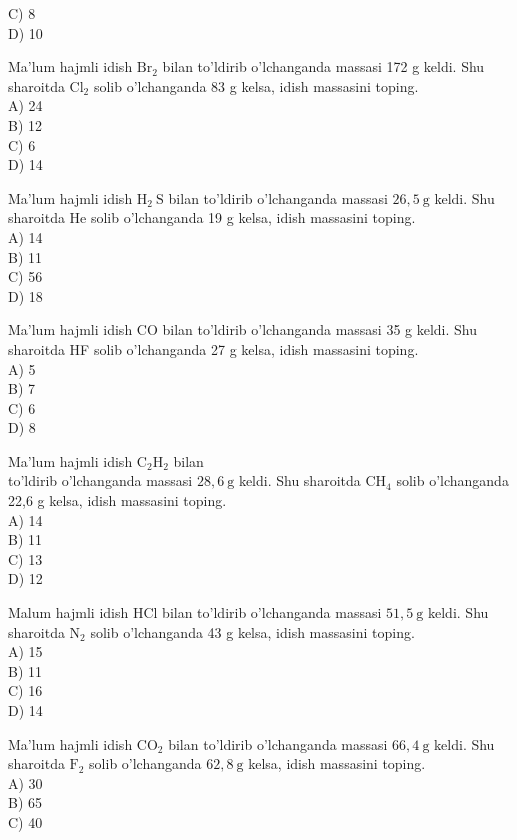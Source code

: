 C) 8\\
D) 10
  \item Ma'lum hajmli idish $\mathrm{Br}_{2}$ bilan to'ldirib o'lchanganda massasi 172 g keldi. Shu sharoitda $\mathrm{Cl}_{2}$ solib o'lchanganda 83 g kelsa, idish massasini toping.\\
A) 24\\
B) 12\\
C) 6\\
D) 14
  \item Ma'lum hajmli idish $\mathrm{H}_{2} \mathrm{~S}$ bilan to'ldirib o'lchanganda massasi $26,5 \mathrm{~g}$ keldi. Shu sharoitda He solib o'lchanganda 19 g kelsa, idish massasini toping.\\
A) 14\\
B) 11\\
C) 56\\
D) 18
  \item Ma'lum hajmli idish CO bilan to'ldirib o'lchanganda massasi 35 g keldi. Shu sharoitda HF solib o'lchanganda 27 g kelsa, idish massasini toping.\\
A) 5\\
B) 7\\
C) 6\\
D) 8
  \item Ma'lum hajmli idish $\mathrm{C}_{2} \mathrm{H}_{2}$ bilan\\
to'ldirib o'lchanganda massasi $28,6 \mathrm{~g}$ keldi. Shu sharoitda $\mathrm{CH}_{4}$ solib o'lchanganda 22,6 g kelsa, idish massasini toping.\\
A) 14\\
B) 11\\
C) 13\\
D) 12
  \item Malum hajmli idish HCl bilan to'ldirib o'lchanganda massasi $51,5 \mathrm{~g}$ keldi. Shu sharoitda $\mathrm{N}_{2}$ solib o'lchanganda 43 g kelsa, idish massasini toping.\\
A) 15\\
B) 11\\
C) 16\\
D) 14
  \item Ma'lum hajmli idish $\mathrm{CO}_{2}$ bilan to'ldirib o'lchanganda massasi $66,4 \mathrm{~g}$ keldi. Shu sharoitda $\mathrm{F}_{2}$ solib o'lchanganda $62,8 \mathrm{~g}$ kelsa, idish massasini toping.\\
A) 30\\
B) 65\\
C) 40\\
